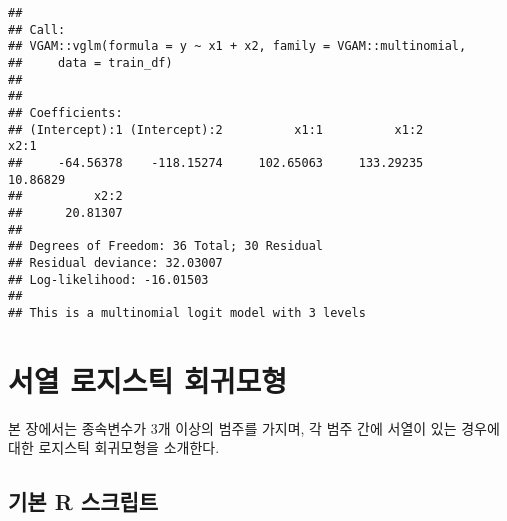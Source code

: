 \documentclass[]{book}
\begin{document}
\begin{verbatim}
## 
## Call:
## VGAM::vglm(formula = y ~ x1 + x2, family = VGAM::multinomial, 
##     data = train_df)
## 
## 
## Coefficients:
## (Intercept):1 (Intercept):2          x1:1          x1:2          x2:1 
##     -64.56378    -118.15274     102.65063     133.29235      10.86829 
##          x2:2 
##      20.81307 
## 
## Degrees of Freedom: 36 Total; 30 Residual
## Residual deviance: 32.03007 
## Log-likelihood: -16.01503 
## 
## This is a multinomial logit model with 3 levels
\end{verbatim}

\hypertarget{ordinal-logistic-regression}{%
\section{서열 로지스틱 회귀모형}\label{ordinal-logistic-regression}}

본 장에서는 종속변수가 3개 이상의 범주를 가지며, 각 범주 간에 서열이 있는 경우에 대한 로지스틱 회귀모형을 소개한다.

\hypertarget{ordinal-logistic-basic-script}{%
\subsection{기본 R 스크립트}\label{ordinal-logistic-basic-script}}
\end{document}
